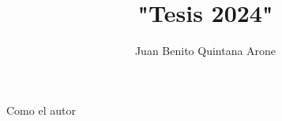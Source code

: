 \documentclass[12pt,a4paper,oneside]{book}
\author{Juan Benito Quintana Arone}
\title{"Tesis 2024"}
\begin{document}
\frontmatter
    
    
    
    \tableofcontents
    \newpage
	\listoftables
	\newpage
	\listoffigures
	\newpage
    
\mainmatter     
    
    
    
    

    
    
    
    
    
    

    Como el autor \cite[]{Einstein1905}
\backmatter
    \printbibliography[title=BIBLIOGRAFÍA]
	\appendix	
\end{document}
